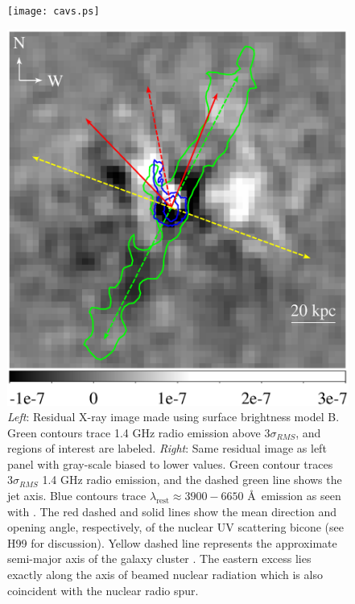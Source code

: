 \begin{figure}
  \begin{center}
    \begin{minipage}{0.495\linewidth}
      \texttt{[image: cavs.ps]}
    \end{minipage}
    \begin{minipage}{0.495\linewidth}
      \includegraphics*[width=\textwidth]{resid_cones.ps}
    \end{minipage}
    \caption{{\it{Left}}: Residual X-ray image made using surface
      brightness model B. Green contours trace 1.4 GHz radio emission
      above $3\sigma_{RMS}$, and regions of interest are
      labeled. {\it{Right}}: Same residual image as left panel with
      gray-scale biased to lower values. Green contour traces
      $3\sigma_{RMS}$ 1.4 GHz radio emission, and the dashed green
      line shows the jet axis. Blue contours trace
      $\lambda_{\mathrm{rest}} \approx 3900-6650$ \AA\ emission as
      seen with \hst. The red dashed and solid lines show the mean
      direction and opening angle, respectively, of the nuclear UV
      scattering bicone (see H99 for discussion). Yellow dashed line
      represents the approximate semi-major axis of the galaxy cluster
      \citep[see][]{1988ApJ...328..161K}. The eastern excess lies
      exactly along the axis of beamed nuclear radiation which is also
      coincident with the nuclear radio spur.}
    \label{fig:resid}
  \end{center}
\end{figure}

